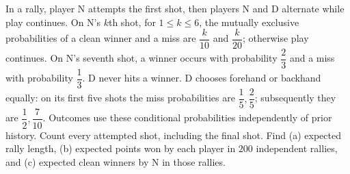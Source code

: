 In a rally, player N attempts the first shot, then players N and D alternate while play continues. On N's $k$th shot, for $1\le k\le6$, the mutually exclusive probabilities of a clean winner and a miss are $\dfrac{k}{10}$ and $\dfrac{k}{20}$; otherwise play continues. On N's seventh shot, a winner occurs with probability $\dfrac{2}{3}$ and a miss with probability $\dfrac{1}{3}$. D never hits a winner. D chooses forehand or backhand equally: on its first five shots the miss probabilities are $\dfrac{1}{5},\dfrac{2}{5}$; subsequently they are $\dfrac{1}{2},\dfrac{7}{10}$. Outcomes use these conditional probabilities independently of prior history. Count every attempted shot, including the final shot. Find (a) expected rally length, (b) expected points won by each player in $200$ independent rallies, and (c) expected clean winners by N in those rallies.
